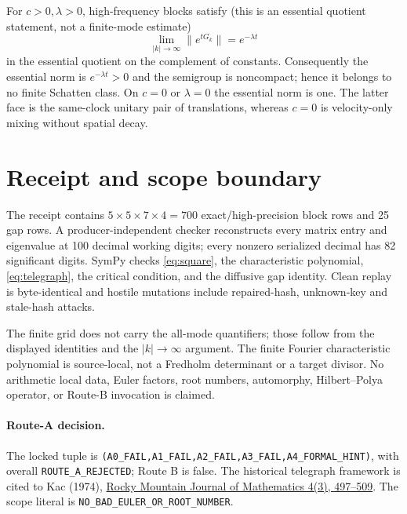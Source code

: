\documentclass[10pt]{article}
\begin{document}
For $c>0,\lambda>0$, high-frequency blocks satisfy (this is an essential
quotient statement, not a finite-mode estimate)
\[
 \lim_{|k|\to\infty}\|e^{tG_k}\|=e^{-\lambda t}
\]
in the essential quotient on the complement of constants.  Consequently the
essential norm is $e^{-\lambda t}>0$ and the semigroup is noncompact; hence it
belongs to no finite Schatten class.  On $c=0$ or $\lambda=0$ the essential
norm is one.  The latter face is the same-clock unitary pair of translations,
whereas $c=0$ is velocity-only mixing without spatial decay.

\section{Receipt and scope boundary}
The receipt contains $5\times5\times7\times4=700$ exact/high-precision block
rows and 25 gap rows.  A producer-independent checker reconstructs every
matrix entry and eigenvalue at 100 decimal working digits; every nonzero
serialized decimal has 82 significant digits.  SymPy checks
\eqref{eq:square}, the characteristic polynomial, \eqref{eq:telegraph}, the
critical condition, and the diffusive gap identity.  Clean replay is
byte-identical and hostile mutations include repaired-hash, unknown-key and
stale-hash attacks.

The finite grid does not carry the all-mode quantifiers; those follow from
the displayed identities and the $|k|\to\infty$ argument.  The finite Fourier
characteristic polynomial is source-local, not a Fredholm determinant or a
target divisor.  No arithmetic local data, Euler factors, root numbers,
automorphy, Hilbert--Polya operator, or Route-B invocation is claimed.

\paragraph{Route-A decision.} The locked tuple is
\texttt{(A0\_FAIL,A1\_FAIL,A2\_FAIL,A3\_FAIL,A4\_FORMAL\_HINT)}, with overall
\texttt{ROUTE\_A\_REJECTED}; Route B is false.  The historical telegraph
framework is cited to Kac (1974),
\href{https://doi.org/10.1216/RMJ-1974-4-3-497}{Rocky Mountain Journal of
Mathematics 4(3), 497--509}.
The scope literal is \texttt{NO\_BAD\_EULER\_OR\_ROOT\_NUMBER}.
\end{document}

